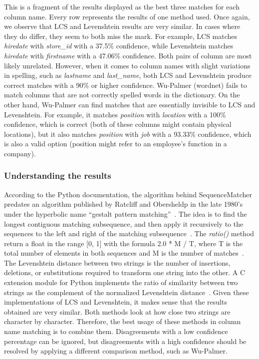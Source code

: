 This is a fragment of the results displayed as the best three matches for each column name.
Every row represents the results of one method used.
Once again, we observe that LCS and Levenshtein results are very similar.
In cases where they do differ, they seem to both miss the mark.
For example, LCS matches \textit{hiredate} with \textit{store\_id} with a 37.5\% confidence, while Levenshtein matches
\textit{hiredate} with \textit{firstname} with a 47.06\% confidence.
Both pairs of column are most likely unrelated.
However, when it comes to column names with slight variations in spelling, such as \textit{lastname} and \textit{last\_name},
both LCS and Levenshtein produce correct matches with a 90\% or higher confidence.
Wu-Palmer (wordnet) fails to match columns that are not correctly spelled words in the dictionary.
On the other hand, Wu-Palmer can find matches that are essentially invisible to LCS and Levenshtein.
For example, it matches \textit{position} with \textit{location} with a 100\% confidence, which is correct (both of these
columns might contain physical locations), but it also matches \textit{position} with \textit{job} with a 93.33\% confidence,
which is also a valid option (position might refer to an employee's function in a company).

\subsubsection{Understanding the results}
According to the Python documentation, the algorithm behind SequenceMatcher predates an algorithm published by Ratcliff
and Obersheldp in the late 1980's under the hyperbolic name ``gestalt pattern matching''~\cite{difflib}.
The idea is to find the longest contiguous matching subsequence, and then apply it recursively to the sequences to the
left and right of the matching subsequence~\cite{difflib}.
The \textit{ratio()} method return a float in the range [0, 1] with the formula 2.0 * M / T, where T is the total number
of elements in both sequences and M is the number of matches~\cite{difflib}.
The Levenshtein distance between two strings is the number of insertions, deletions, or substitutions required to transform
one string into the other.
A C extension module for Python implements the ratio of similarity between two strings as the complement of the normalized
Levenshtein distance~\cite{Levenshtein}.
Given these implementations of LCS and Levenshtein, it makes sense that the results obtained are very similar.
Both methods look at how close two strings are character by character.
Therefore, the best usage of these methods in column name matching is to combine them.
Disagreements with a low confidence percentage can be ignored, but disagreements with a high confidence should be resolved
by applying a different comparison method, such as Wu-Palmer.

